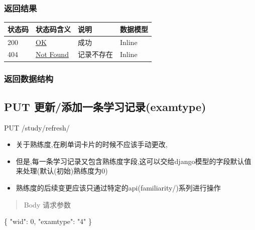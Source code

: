 \documentclass[
]{article}
\newenvironment{Shaded}{}{}
\newcommand{\DataTypeTok}[1]{\textcolor[rgb]{0.56,0.13,0.00}{#1}}
\newcommand{\DecValTok}[1]{\textcolor[rgb]{0.25,0.63,0.44}{#1}}
\newcommand{\FunctionTok}[1]{\textcolor[rgb]{0.02,0.16,0.49}{#1}}
\newcommand{\StringTok}[1]{\textcolor[rgb]{0.25,0.44,0.63}{#1}}
\begin{document}
\hypertarget{ux8fd4ux56deux7ed3ux679c-10}{%
\subsubsection{返回结果}\label{ux8fd4ux56deux7ed3ux679c-10}}

\begin{longtable}[]{@{}llll@{}}
\toprule
状态码 & 状态码含义 & 说明 & 数据模型 \\
\midrule
\endhead
200 & \href{https://tools.ietf.org/html/rfc7231\#section-6.3.1}{OK} &
成功 & Inline \\
404 & \href{https://tools.ietf.org/html/rfc7231\#section-6.5.4}{Not
Found} & 记录不存在 & Inline \\
\bottomrule
\end{longtable}

\hypertarget{ux8fd4ux56deux6570ux636eux7ed3ux6784-9}{%
\subsubsection{返回数据结构}\label{ux8fd4ux56deux6570ux636eux7ed3ux6784-9}}

\hypertarget{put-ux66f4ux65b0ux6dfbux52a0ux4e00ux6761ux5b66ux4e60ux8bb0ux5f55examtype}{%
\subsection{PUT
更新/添加一条学习记录(examtype)}\label{put-ux66f4ux65b0ux6dfbux52a0ux4e00ux6761ux5b66ux4e60ux8bb0ux5f55examtype}}

PUT /study/refresh/

\begin{itemize}
\item
  关于熟练度,在刷单词卡片的时候不应该手动更改,
\item
  但是,每一条学习记录又包含熟练度字段,这可以交给django模型的字段默认值来处理(默认(初始)熟练度为0)
\item
  熟练度的后续变更应该只通过特定的api(familiarity/)系列进行操作
\end{itemize}

\begin{quote}
Body 请求参数
\end{quote}

\begin{Shaded}
\begin{Highlighting}[]
\FunctionTok{\{}
  \DataTypeTok{"wid"}\FunctionTok{:} \DecValTok{0}\FunctionTok{,}
  \DataTypeTok{"examtype"}\FunctionTok{:} \StringTok{"4"}
\FunctionTok{\}}
\end{Highlighting}
\end{Shaded}
\end{document}
